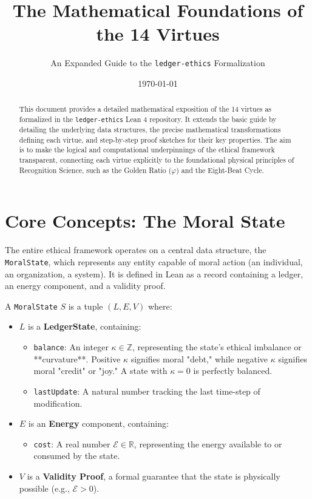 \documentclass[11pt,a4paper]{article}
\title{\textbf{The Mathematical Foundations of the 14 Virtues}}
\author{An Expanded Guide to the \texttt{ledger-ethics} Formalization}
\date{\today}
\begin{document}
\maketitle

\begin{abstract}
\noindent This document provides a detailed mathematical exposition of the 14 virtues as formalized in the \texttt{ledger-ethics} Lean 4 repository. It extends the basic guide by detailing the underlying data structures, the precise mathematical transformations defining each virtue, and step-by-step proof sketches for their key properties. The aim is to make the logical and computational underpinnings of the ethical framework transparent, connecting each virtue explicitly to the foundational physical principles of Recognition Science, such as the Golden Ratio ($\varphi$) and the Eight-Beat Cycle.
\end{abstract}

\tableofcontents
\newpage

\section{Core Concepts: The Moral State}

The entire ethical framework operates on a central data structure, the \texttt{MoralState}, which represents any entity capable of moral action (an individual, an organization, a system). It is defined in Lean as a record containing a ledger, an energy component, and a validity proof.

\begin{tcolorbox}[colback=gray!5,colframe=sectioncolor!75!black,title=Definition: MoralState]
A \texttt{MoralState} $S$ is a tuple $(L, E, V)$ where:
\begin{itemize}
    \item $L$ is a \textbf{LedgerState}, containing:
        \begin{itemize}
            \item \texttt{balance}: An integer $\kappa \in \mathbb{Z}$, representing the state's ethical imbalance or **curvature**. Positive $\kappa$ signifies moral "debt," while negative $\kappa$ signifies moral "credit" or "joy." A state with $\kappa=0$ is perfectly balanced.
            \item \texttt{lastUpdate}: A natural number tracking the last time-step of modification.
        \end{itemize}
    \item $E$ is an \textbf{Energy} component, containing:
        \begin{itemize}
            \item \texttt{cost}: A real number $\mathcal{E} \in \mathbb{R}$, representing the energy available to or consumed by the state.
        \end{itemize}
    \item $V$ is a \textbf{Validity Proof}, a formal guarantee that the state is physically possible (e.g., $\mathcal{E} > 0$).
\end{itemize}
\end{tcolorbox}
\end{document}
